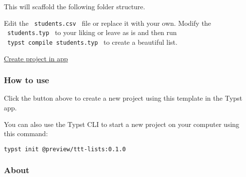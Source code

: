 \begin{Shaded}
\begin{Highlighting}[]
\end{Highlighting}
\end{Shaded}

This will scaffold the following folder structure.

\begin{Shaded}
\begin{Highlighting}[]
\end{Highlighting}
\end{Shaded}

Edit the \texttt{\ students.csv\ } file or replace it with your own.
Modify the \texttt{\ students.typ\ } to your liking or leave as is and
then run \texttt{\ typst\ compile\ students.typ\ } to create a beautiful
list.

\href{/app?template=ttt-lists&version=0.1.0}{Create project in app}

\subsubsection{How to use}\label{how-to-use}

Click the button above to create a new project using this template in
the Typst app.

You can also use the Typst CLI to start a new project on your computer
using this command:

\begin{verbatim}
typst init @preview/ttt-lists:0.1.0
\end{verbatim}



\subsubsection{About}\label{about}

